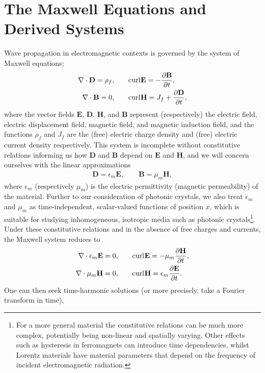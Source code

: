 \section{The Maxwell Equations and Derived Systems} \label{sec:Intro-Maxwell}
Wave propagation in electromagnetic contexts is governed by the system of Maxwell equations;
\begin{align*}
	\nabla\cdot \mathbf{D} = \rho_f, &\qquad
	\mathrm{curl}_{}\mathbf{E} = -\dfrac{\partial \mathbf{B}}{\partial t}, \\
	\nabla\cdot \mathbf{B} = 0, &\qquad
	 \mathrm{curl}_{}\mathbf{H} = J_f + \dfrac{\partial \mathbf{D}}{\partial t},
\end{align*}
where the vector fields $\mathbf{E}$, $\mathbf{D}$, $\mathbf{H}$, and $\mathbf{B}$ represent (respectively) the electric field, electric displacement field, magnetic field, and magnetic induction field, and the functions $\rho_f$ and $J_f$ are the (free) electric charge density and (free) electric current density respectively.
This system is incomplete without constitutive relations informing us how $\mathbf{D}$ and $\mathbf{B}$ depend on $\mathbf{E}$ and $\mathbf{H}$, and we will concern ourselves with the linear approximations
\begin{align*}
	\mathbf{D} = \epsilon_m \mathbf{E}, \qquad \mathbf{B} = \mu_{m}\mathbf{H},
\end{align*}
where $\epsilon_m$ (respectively $\mu_m$) is the electric permittivity (magnetic permeability) of the material.
Further to our consideration of photonic crystals, we also treat $\epsilon_m$ and $\mu_m$ as time-independent, scalar-valued functions of position $x$, which is suitable for studying inhomogeneous, isotropic media such as photonic crystals\footnote{For a more general material the constitutive relations can be much more complex, potentially being non-linear and spatially varying. 
Other effects such as hysteresis in ferromagnets can introduce time dependencies, whilst Lorentz materials have material parameters that depend on the frequency of incident electromagnetic radiation.}.
Under these constitutive relations and in the absence of free charges and currents, the Maxwell system reduces to
\begin{align*}
	\nabla\cdot \epsilon_m \mathbf{E} = 0, &\qquad
	\mathrm{curl}_{}\mathbf{E} = -\mu_m\dfrac{\partial \mathbf{H}}{\partial t}, \\
	\nabla\cdot \mu_m \mathbf{H} = 0, &\qquad
	\mathrm{curl}_{}\mathbf{H} = \epsilon_m \dfrac{\partial \mathbf{E}}{\partial t}.
\end{align*}
One can then seek time-harmonic solutions (or more precisely, take a Fourier transform in time), 
